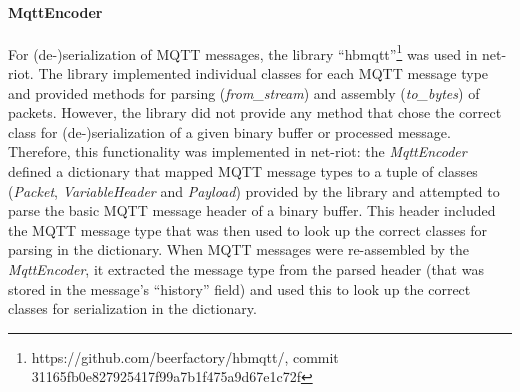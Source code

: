 \paragraph{MqttEncoder} For (de-)serialization of \ac{MQTT} messages, the library \enquote{hbmqtt}\footnote{https://github.com/beerfactory/hbmqtt/, commit 31165fb0e827925417f99a7b1f475a9d67e1c72f} was used in net-riot. The library implemented individual classes for each \ac{MQTT} message type and provided methods for parsing (\emph{from\_stream}) and assembly (\emph{to\_bytes}) of packets. However, the library did not provide any method that chose the correct class for (de-)serialization of a given binary buffer or processed message. Therefore, this functionality was implemented in net-riot: the \emph{MqttEncoder} defined a dictionary that mapped \ac{MQTT} message types to a tuple of classes (\emph{Packet}, \emph{VariableHeader} and \emph{Payload}) provided by the library and attempted to parse the basic \ac{MQTT} message header of a binary buffer. This header included the \ac{MQTT} message type that was then used to look up the correct classes for parsing in the dictionary. When \ac{MQTT} messages were re-assembled by the \emph{MqttEncoder}, it extracted the message type from the parsed header (that was stored in the message's \enquote{history} field) and used this to look up the correct classes for serialization in the dictionary.

%


